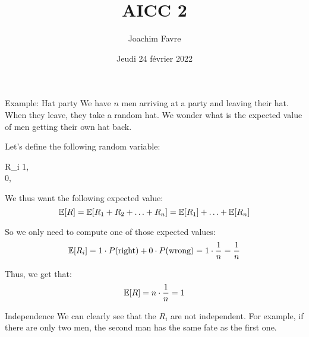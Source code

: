 \documentclass[a4paper]{article}
\title{AICC 2}
\author{Joachim Favre}
\date{Jeudi 24 février 2022}
\begin{document}
\maketitle


\begin{parag}{Example: Hat party}
    We have $n$ men arriving at a party and leaving their hat. When they leave, they take a random hat. We wonder what is the expected value of men getting their own hat back.

    Let's define the following random variable: 
    \begin{functionbypart}{R_i}
    1, \mathspace {} \\
    0, \mathspace {}
    \end{functionbypart}
    
    We thus want the following expected value: 
    \[\exval\left[R\right] = \exval\left[R_1 + R_2 + \ldots + R_n\right] = \exval\left[R_1\right] + \ldots + \exval\left[R_n\right]\]
    
    So we only need to compute one of those expected values: 
    \[\exval\left[R_i\right] = 1 \cdot P\left(\text{right}\right) + 0\cdot P\left(\text{wrong}\right) = 1 \cdot \frac{1}{n} = \frac{1}{n}\]
    
    Thus, we get that: 
    \[\exval\left[R\right] = n \cdot \frac{1}{n} = 1\]

    \begin{subparag}{Independence}
        We can clearly see that the $R_i$ are not independent. For example, if there are only two men, the second man has the same fate as the first one.
    \end{subparag}
\end{parag}
\end{document}
